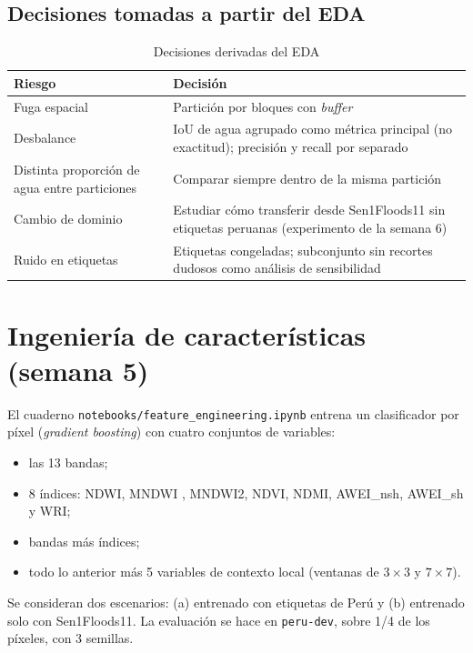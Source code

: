 \subsection{Decisiones tomadas a partir del EDA}

\begin{table}[H]
    \centering
    \small
    \caption{Decisiones derivadas del EDA}
    \label{tab:sprint_eda_decisiones}
    \begin{tabular}{|p{5.0cm}|p{9.5cm}|}
        \hline
        \textbf{Riesgo} & \textbf{Decisión} \\
        \hline
        Fuga espacial & Partición por bloques con \textit{buffer} \\
        \hline
        Desbalance & IoU de agua agrupado como métrica principal (no exactitud); precisión y recall por separado \\
        \hline
        Distinta proporción de agua entre particiones & Comparar siempre dentro de la misma partición \\
        \hline
        Cambio de dominio & Estudiar cómo transferir desde Sen1Floods11 sin etiquetas peruanas (experimento de la semana 6) \\
        \hline
        Ruido en etiquetas & Etiquetas congeladas; subconjunto sin recortes dudosos como análisis de sensibilidad \\
        \hline
    \end{tabular}
\end{table}

\section{Ingeniería de características (semana 5)}

El cuaderno \texttt{notebooks/\allowbreak{}feature\_\allowbreak{}engineering.ipynb} entrena un clasificador por píxel
(\textit{gradient boosting}) con cuatro conjuntos de variables:
\begin{itemize}
    \item las 13 bandas;
    \item 8 índices: NDWI, MNDWI \cite{xu_modification_2006}, MNDWI2, NDVI, NDMI, AWEI\_nsh, AWEI\_sh
    y WRI;
    \item bandas más índices;
    \item todo lo anterior más 5 variables de contexto local (ventanas de $3 \times 3$ y $7 \times 7$).
\end{itemize}
Se consideran dos escenarios: (a) entrenado con etiquetas de Perú y (b) entrenado solo con
Sen1Floods11. La evaluación se hace en \texttt{peru-\allowbreak{}dev}, sobre 1/4 de los píxeles, con 3 semillas.

